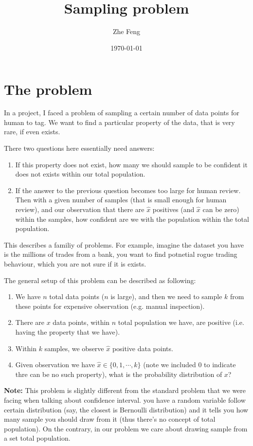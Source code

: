 \documentclass{article} [10pt] %
\title{Sampling problem}
\author{Zhe Feng}
\date{\today}
\begin{document}
\noindent
\section{The problem}	\label{sec:the_problem}
In a project, I faced a problem of sampling a certain number of data points for human to tag. We want to find a particular property of the data, that is very rare, if even exists.

There two questions here essentially need answers:
\begin{enumerate}
	\item If this property does not exist, how many we should sample to be confident it does not exists within our total population.
	\item If the answer to the previous question becomes too large for human review. Then with a given number of samples (that is small enough for human review), and our observation that there are $\hat{x}$ positives (and $\hat{x}$ can be zero) within the samples, how confident are we with the population within the total population.
\end{enumerate}
This describes a familiy of problems. For example, imagine the dataset you have is the millions of trades from a bank, you want to find potnetial rogue trading behaviour, which you are not sure if it is exists.


The general setup of this problem can be described as following:
\begin{enumerate}
	\item We have $n$ total data points ($n$ is large), and then we need to sample $k$ from these points for expensive observation (e.g. manual inspection).
	\item There are $x$ data points, within $n$ total population we have, are positive (i.e. having the property that we have).
	\item Within $k$ samples, we observe $\hat{x}$ positive data points.
	\item Given observation we have $\hat{x} \in \{0, 1, \cdots, k\}$ (note we included 0 to indicate thre can be no such property), what is the probability distribution of $x$?
\end{enumerate}

\textbf{Note:} This problem is slightly different from the standard problem that we were facing when talking about confidence interval. you have a random variable follow certain distribution (say, the closest is Bernoulli distribution) and it tells you how many sample you should draw from it (thus there's no concept of total population). On the contrary, in our problem we care about drawing sample from a set total population.
\end{document}
